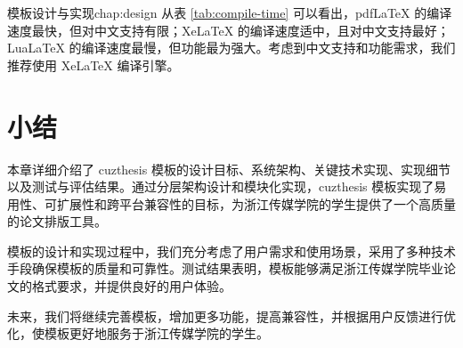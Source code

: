\begin{cuzchapter}{模板设计与实现}{chap:design}
    从表 \ref{tab:compile-time} 可以看出，pdfLaTeX 的编译速度最快，但对中文支持有限；XeLaTeX 的编译速度适中，且对中文支持最好；LuaLaTeX 的编译速度最慢，但功能最为强大。考虑到中文支持和功能需求，我们推荐使用 XeLaTeX 编译引擎。
    
    \section{小结}\label{sec:design-summary}
    
    本章详细介绍了 cuzthesis 模板的设计目标、系统架构、关键技术实现、实现细节以及测试与评估结果。通过分层架构设计和模块化实现，cuzthesis 模板实现了易用性、可扩展性和跨平台兼容性的目标，为浙江传媒学院的学生提供了一个高质量的论文排版工具。
    
    模板的设计和实现过程中，我们充分考虑了用户需求和使用场景，采用了多种技术手段确保模板的质量和可靠性。测试结果表明，模板能够满足浙江传媒学院毕业论文的格式要求，并提供良好的用户体验。
    
    未来，我们将继续完善模板，增加更多功能，提高兼容性，并根据用户反馈进行优化，使模板更好地服务于浙江传媒学院的学生。

\end{cuzchapter}
